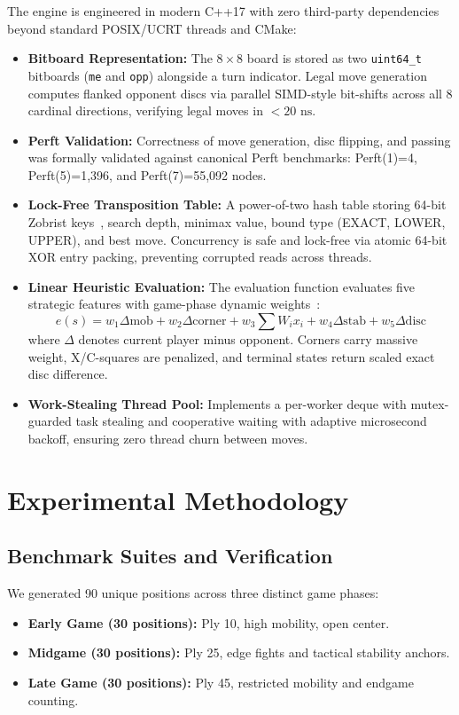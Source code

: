 \documentclass[11pt,a4paper]{article}
\begin{document}
The engine is engineered in modern C++17 with zero third-party dependencies beyond standard POSIX/UCRT threads and CMake:
\begin{itemize}
    \item \textbf{Bitboard Representation:} The $8 \times 8$ board is stored as two \texttt{uint64\_t} bitboards (\texttt{me} and \texttt{opp}) alongside a turn indicator. Legal move generation computes flanked opponent discs via parallel SIMD-style bit-shifts across all 8 cardinal directions, verifying legal moves in $<20\text{ ns}$.
    \item \textbf{Perft Validation:} Correctness of move generation, disc flipping, and passing was formally validated against canonical Perft benchmarks: Perft(1)=4, Perft(5)=1,396, and Perft(7)=55,092 nodes.
    \item \textbf{Lock-Free Transposition Table:} A power-of-two hash table storing 64-bit Zobrist keys~\cite{zobrist1970hashing}, search depth, minimax value, bound type (EXACT, LOWER, UPPER), and best move. Concurrency is safe and lock-free via atomic 64-bit XOR entry packing, preventing corrupted reads across threads.
    \item \textbf{Linear Heuristic Evaluation:} The evaluation function evaluates five strategic features with game-phase dynamic weights~\cite{rosenbloom1982world, buro2002improving}:
    \begin{equation}
    e(s) = w_1 \Delta\text{mob} + w_2 \Delta\text{corner} + w_3 \sum W_i x_i + w_4 \Delta\text{stab} + w_5 \Delta\text{disc}
    \label{eq:eval}
    \end{equation}
    where $\Delta$ denotes current player minus opponent. Corners carry massive weight, X/C-squares are penalized, and terminal states return scaled exact disc difference.
    \item \textbf{Work-Stealing Thread Pool:} Implements a per-worker deque with mutex-guarded task stealing and cooperative waiting with adaptive microsecond backoff, ensuring zero thread churn between moves.
\end{itemize}

\section{Experimental Methodology}
\label{sec:experiments}

\subsection{Benchmark Suites and Verification}
We generated 90 unique positions across three distinct game phases:
\begin{itemize}
    \item \textbf{Early Game (30 positions):} Ply 10, high mobility, open center.
    \item \textbf{Midgame (30 positions):} Ply 25, edge fights and tactical stability anchors.
    \item \textbf{Late Game (30 positions):} Ply 45, restricted mobility and endgame counting.
\end{itemize}
\end{document}
